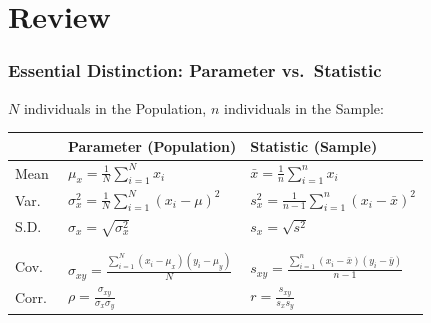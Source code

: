 \documentclass[handout]{beamer}
\begin{document}
\section{Review}
\begin{frame}
\frametitle{Essential Distinction: Parameter vs.\ Statistic}
	$N$ individuals in the Population, $n$ individuals in the Sample:
	\vspace{1em}
	\small
	\begin{tabular}{l|l|l}
		&\textbf{Parameter} (Population)&\textbf{Statistic} (Sample)\\
		\hline
		Mean&$\displaystyle\mu_x = \frac{1}{N} \sum_{i = 1}^N x_i$& $\displaystyle\bar{x} = \frac{1}			{n} \sum_{i = 1}^n x_i$ \\
		Var.\ &$\displaystyle \sigma_x^2 = \frac{1}{N}\sum_{i = 1}^N (x_i - \mu)^2$ &$\displaystyle 			s_x^2 = \frac{1}{n - 1}\sum_{i = 1}^n(x_i - \bar{x})^2$\\
		S.D.\ &$\sigma_x = \sqrt{\sigma_x^2}$ &$s_x = \sqrt{s^2}$ \\
		&&\\
		\hline
		&&\\
		\alert{Cov.\ }&\alert{$\displaystyle \sigma_{xy} = \frac{\sum_{i = 1}^N(x_i - \mu_x)(y_i - 				\mu_y)}{N}$} &\alert{$\displaystyle s_{xy} = \frac{\sum_{i = 1}^n(x_i - \bar{x})(y_i - \bar{y})}			{n - 1}$}\\
		\alert{Corr.\ } & \alert{$\displaystyle \rho = \frac{\sigma_{xy}}{\sigma_x \sigma_y}$}& 					\alert{$\displaystyle r = \frac{s_{xy}}{s_x s_y}$}
	\end{tabular}
\end{frame}

\end{document}
